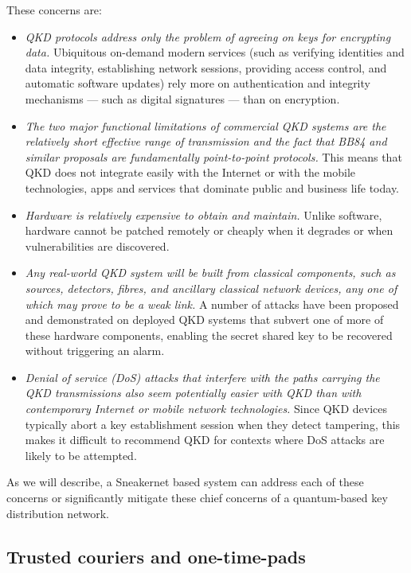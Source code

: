 \documentclass[twocolumn, aps, rmp, amsmath, amssymb, nofootinbib, superscriptaddress, longbibliography, floatfix, table-of-contents, eqsecnum]{revtex4-2}
\begin{document}
These concerns are:
\begin{itemize}
\item \textit{QKD protocols address only the problem of agreeing on keys for encrypting data.} Ubiquitous on-demand modern services (such as verifying identities and data integrity, establishing network sessions, providing access control, and automatic software updates) rely more on authentication and integrity mechanisms — such as digital signatures — than on encryption.
\item \textit{The two major functional limitations of commercial QKD systems are the relatively short effective range of transmission and the fact that BB84 and similar proposals are fundamentally point-to-point protocols.} This means that QKD does not integrate easily with the Internet or with the mobile technologies, apps and services that dominate public and business life today.
\item \textit{Hardware is relatively expensive to obtain and maintain.} Unlike software, hardware cannot be patched remotely or cheaply when it degrades or when vulnerabilities are discovered.
\item \textit{Any real-world QKD system will be built from classical components, such as sources, detectors, fibres, and ancillary classical network devices, any one of which may prove to be a weak link.} A number of attacks have been proposed and demonstrated on deployed QKD systems that subvert one of more of these hardware components, enabling the secret shared key to be recovered without triggering an alarm.
\item \textit{Denial of service (DoS) attacks that interfere with the paths carrying the QKD transmissions also seem potentially easier with QKD than with contemporary Internet or mobile network technologies.} Since QKD devices typically abort a key establishment session when they detect tampering, this makes it difficult to recommend QKD for contexts where DoS attacks are likely to be attempted.
\end{itemize}

As we will describe, a Sneakernet based system can address each of these concerns or significantly mitigate these chief concerns of a quantum-based key distribution network.

\subsection{Trusted couriers and one-time-pads}
\end{document}
